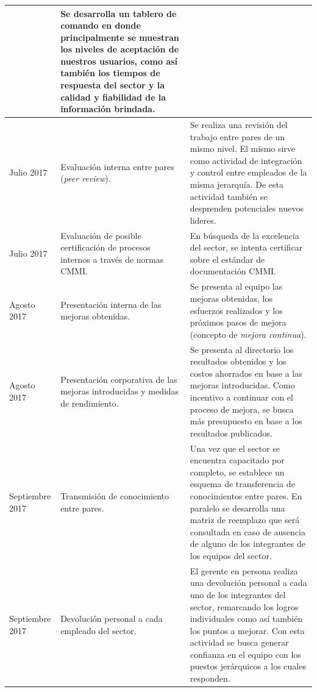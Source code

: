 \begin{center}
\begin{longtable}{|>{\centering\arraybackslash}m{3cm}|>{\centering\arraybackslash}m{3cm}|m{7cm}|}
&
Se desarrolla un tablero de comando en donde principalmente se muestran los niveles de aceptación de nuestros usuarios, como así también los tiempos de respuesta del sector y la calidad y fiabilidad de la información brindada.
\\
\hline
Julio 2017
&
Evaluación interna entre pares (\textit{peer review}).
&
Se realiza una revisión del trabajo entre pares de un mismo nivel. El mismo sirve como actividad de integración y control entre empleados de la misma jerarquía.
De esta actividad también se desprenden potenciales nuevos lideres.
\\
\hline
Julio 2017
&
Evaluación de posible certificación de procesos internos a través de normas CMMI.
&
En búsqueda de la excelencia del sector, se intenta certificar sobre el estándar de documentación CMMI.
\\
\hline
Agosto 2017
&
Presentación interna de las mejoras obtenidas.
&
Se presenta al equipo las mejoras obtenidas, los esfuerzos realizados y los próximos pasos de mejora (concepto de \textit{mejora continua}).
\\
\hline
Agosto 2017
&
Presentación corporativa de las mejoras introducidas y medidas de rendimiento.
&
Se presenta al directorio los resultados obtenidos y los costos ahorrados en base a las mejoras introducidas. Como incentivo a continuar con el proceso de mejora, se busca más presupuesto en base a los resultados publicados.
\\
\hline
Septiembre 2017
&
Transmisión de conocimiento entre pares.
&
Una vez que el sector se encuentra capacitado por completo, se establece un esquema de transferencia de conocimientos entre pares. En paralelo se desarrolla una matriz de reemplazo que será consultada en caso de ausencia de alguno de los integrantes de los equipos del sector.
\\
\hline
Septiembre 2017
&
Devolución personal a cada empleado del sector.
&
El gerente en persona realiza una devolución personal a cada uno de los integrantes del sector, remarcando los logros individuales como así también los puntos a mejorar. Con esta actividad se busca generar confianza en el equipo con los puestos jerárquicos a los cuales responden.
\\
\hline

\end{longtable}
\end{center}
